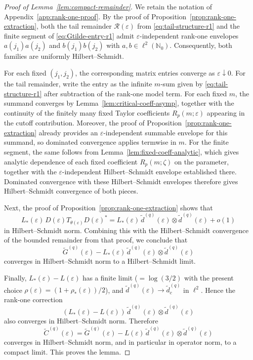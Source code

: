 \documentclass[11pt]{amsart}
\numberwithin{equation}{section}
\theoremstyle{plain}
\theoremstyle{definition}
\theoremstyle{remark}
\begin{document}
\begin{proof}[Proof of Lemma~\ref{lem:compact-remainder}]
We retain the notation of
Appendix~\ref{app:rank-one-proof}. By the proof of
Proposition~\ref{prop:rank-one-extraction}, both the tail remainder
\(\mathcal R(\varepsilon)\) from \eqref{eq:tail-structure-r1} and the finite
segment of \eqref{eq:Gtilde-entry-r1} admit \(\varepsilon\)-independent
rank-one envelopes \(a(j_1)a(j_2)\) and \(b(j_1)b(j_2)\) with
\(a,b\in\ell^2(\mathbb N_0)\). Consequently, both families are uniformly
Hilbert--Schmidt.

For each fixed \((j_1,j_2)\), the corresponding matrix entries converge as
\(\varepsilon\downarrow0\). For the tail remainder, write the entry as the
infinite \(m\)-sum given by \eqref{eq:tail-structure-r1} after subtraction of the
rank-one model term. For each fixed \(m\), the summand converges by
Lemma~\ref{lem:critical-coeff-asymp}, together with the continuity of the
finitely many fixed Taylor coefficients \(R_p(m;\varepsilon)\) appearing in the
cutoff contribution. Moreover, the proof of
Proposition~\ref{prop:rank-one-extraction} already provides an
\(\varepsilon\)-independent summable envelope for this summand, so dominated
convergence applies termwise in \(m\). For the finite segment, the same follows
from Lemma~\ref{lem:fixed-coeff-analytic}, which gives analytic dependence of each fixed coefficient \(R_p(m;\zeta)\) on the
parameter, together with the \(\varepsilon\)-independent Hilbert--Schmidt
envelope established there. Dominated convergence with these Hilbert--Schmidt
envelopes therefore gives Hilbert--Schmidt convergence of both pieces.

Next, the proof of
Proposition~\ref{prop:rank-one-extraction} shows that
\[
L_*(\varepsilon)\,
D(\varepsilon)T_{\theta(\varepsilon)}D(\varepsilon)^*
=
L_*(\varepsilon)\,
\widetilde d^{(q)}(\varepsilon)\otimes \widetilde d^{(q)}(\varepsilon)
+
o(1)
\]
in Hilbert--Schmidt norm. Combining this with the Hilbert--Schmidt convergence
of the bounded remainder from that proof, we conclude that
\[
\widetilde G^{(q)}(\varepsilon)
-
L_*(\varepsilon)\,
\widetilde d^{(q)}(\varepsilon)\otimes \widetilde d^{(q)}(\varepsilon)
\]
converges in Hilbert--Schmidt norm to a Hilbert--Schmidt limit.

Finally, \(L_*(\varepsilon)-L(\varepsilon)\) has a finite limit
(\(= \log(3/2)\) with the present choice \(\rho(\varepsilon)=(1+\rho_*(\varepsilon))/2\)),
and \(\widetilde d^{(q)}(\varepsilon)\to \widetilde d_c^{(q)}\) in \(\ell^2\).
Hence the rank-one correction
\[
(L_*(\varepsilon)-L(\varepsilon))\,
\widetilde d^{(q)}(\varepsilon)\otimes \widetilde d^{(q)}(\varepsilon)
\]
also converges in Hilbert--Schmidt norm. Therefore
\[
\widetilde C^{(q)}(\varepsilon)
=
\widetilde G^{(q)}(\varepsilon)
-
L(\varepsilon)\,
\widetilde d^{(q)}(\varepsilon)\otimes \widetilde d^{(q)}(\varepsilon)
\]
converges in Hilbert--Schmidt norm, and in particular in operator norm, to a
compact limit. This proves the lemma.
\end{proof}


% 


\end{document}
